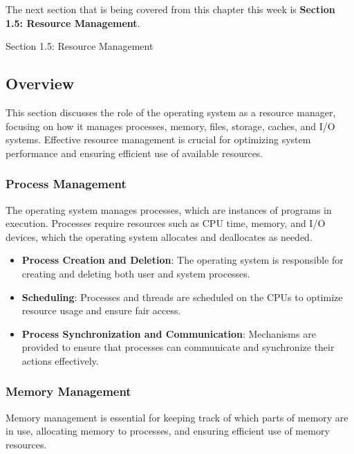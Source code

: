 The next section that is being covered from this chapter this week is \textbf{Section 1.5: Resource Management}.

\begin{notes}{Section 1.5: Resource Management}
    \subsection*{Overview}

    This section discusses the role of the operating system as a resource manager, focusing on how it manages processes, memory, files, storage, caches, and I/O systems. Effective resource management 
    is crucial for optimizing system performance and ensuring efficient use of available resources.
    
    \subsubsection*{Process Management}
    
    The operating system manages processes, which are instances of programs in execution. Processes require resources such as CPU time, memory, and I/O devices, which the operating system allocates 
    and deallocates as needed.
    
    \begin{highlight}
    
    \begin{itemize}
        \item \textbf{Process Creation and Deletion}: The operating system is responsible for creating and deleting both user and system processes.
        \item \textbf{Scheduling}: Processes and threads are scheduled on the CPUs to optimize resource usage and ensure fair access.
        \item \textbf{Process Synchronization and Communication}: Mechanisms are provided to ensure that processes can communicate and synchronize their actions effectively.
    \end{itemize}
    
    \end{highlight}
    
    \subsubsection*{Memory Management}
    
    Memory management is essential for keeping track of which parts of memory are in use, allocating memory to processes, and ensuring efficient use of memory resources.
    

\end{notes}
